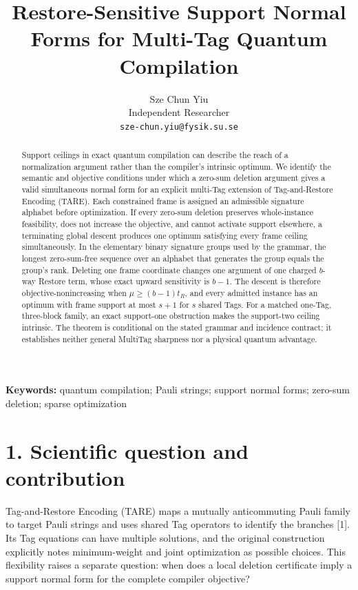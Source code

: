 \documentclass[11pt]{article}
\title{Restore-Sensitive Support Normal Forms for Multi-Tag Quantum Compilation}
\author{Sze Chun Yiu\\Independent Researcher\\\texttt{sze-chun.yiu@fysik.su.se}}
\date{}
\begin{document}
\maketitle
\begin{abstract}
Support ceilings in exact quantum compilation can describe the reach of a normalization argument rather than the compiler's intrinsic optimum. We identify the semantic and objective conditions under which a zero-sum deletion argument gives a valid simultaneous normal form for an explicit multi-Tag extension of Tag-and-Restore Encoding (TARE). Each constrained frame is assigned an admissible signature alphabet before optimization. If every zero-sum deletion preserves whole-instance feasibility, does not increase the objective, and cannot activate support elsewhere, a terminating global descent produces one optimum satisfying every frame ceiling simultaneously. In the elementary binary signature groups used by the grammar, the longest zero-sum-free sequence over an alphabet that generates the group equals the group's rank. Deleting one frame coordinate changes one argument of one charged \(b\)-way Restore term, whose exact upward sensitivity is \(b-1\). The descent is therefore objective-nonincreasing when \(\mu\geq (b-1)t_R\), and every admitted instance has an optimum with frame support at most \(s+1\) for \(s\) shared Tags. For a matched one-Tag, three-block family, an exact support-one obstruction makes the support-two ceiling intrinsic. The theorem is conditional on the stated grammar and incidence contract; it establishes neither general MultiTag sharpness nor a physical quantum advantage.
\end{abstract}
\noindent\textbf{Keywords:} quantum compilation; Pauli strings; support normal forms; zero-sum deletion; sparse optimization

\hypertarget{scientific-question-and-contribution}{%
\section*{1. Scientific question and contribution}\label{scientific-question-and-contribution}}

Tag-and-Restore Encoding (TARE) maps a mutually anticommuting Pauli family to target Pauli strings and uses shared Tag operators to identify the branches {[}1{]}. Its Tag equations can have multiple solutions, and the original construction explicitly notes minimum-weight and joint optimization as possible choices. This flexibility raises a separate question: when does a local deletion certificate imply a support normal form for the complete compiler objective?
\end{document}
